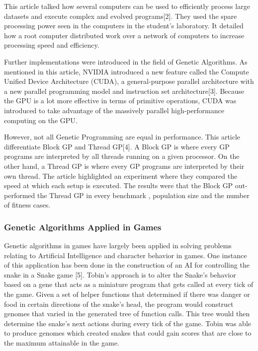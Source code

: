 \documentclass[letterpaper,10pt,titlepage]{article}
\begin{document}
	This article talked how several computers can be used to efficiently process large datasets and execute complex and evolved programs[2].  
	They used the spare processing power seen in the computers in the student's laboratory.  It detailed how a root computer distributed work over a network of computers to increase processing speed and efficiency.
	
	Further implementations were introduced in the field of Genetic Algorithms.  As mentioned in this article, NVIDIA introduced a new feature called the Compute Unified Device Architecture (CUDA), 
	a general-purpose parallel architecture with a new parallel programming model and instruction set architecture[3].  Because the GPU is a lot more effective in terms of primitive operations, 
	CUDA was introduced to take advantage of the massively parallel high-performance computing on the GPU.  

	However, not all Genetic Programming are equal in performance.  This article  differentiate Block GP and Thread GP[4].  A Block GP is where every GP programs are 
	interpreted by all threads running on a given processor.  On the other hand, a Thread GP is where every GP programs are interpreted by their own thread.  The article 
	highlighted an experiment where they compared the speed at which each setup is executed.  The results were that the Block GP out-performed the Thread GP in every benchmark , 
	population size and the number of fitness cases.

\subsubsection*{Genetic Algorithms Applied in Games}	

	Genetic algorithms in games have largely been applied in solving problems relating to Artificial Intelligence and character behavior in games. One instance of this application 
	has been done in the construction of an AI for controlling the snake in a Snake game [5]. Tobin's approach is to alter the Snake's behavior based on a gene that acts as a miniature 
	program that gets called at every tick of the game. Given a set of helper functions that determined if there was danger or food in certain directions of the snake's head, the program 
	would construct genomes that varied in the generated tree of function calls. This tree would then determine the snake's next actions during every tick of the game. Tobin was able to 
	produce genomes which created snakes that could gain scores that are close to the maximum attainable in the game.  
\end{document}
